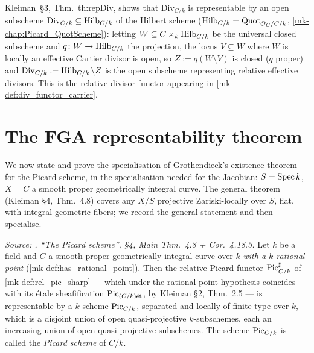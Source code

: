 \begin{remark}
  \label{mk-rem:div_functor_representability}
  Kleiman~\S 3, Thm.~th:repDiv, shows that \(\mathrm{Div}_{C/k}\) is
  representable by an open subscheme \(\mathrm{Div}_{C/k} \subseteq
  \operatorname{Hilb}_{C/k}\) of the Hilbert scheme (\(\operatorname{Hilb}_{C/k} =
  \operatorname{Quot}_{\mathcal{O}_C/C/k}\), \ref{mk-chap:Picard_QuotScheme}): letting
  \(W \subseteq C \times_k \operatorname{Hilb}_{C/k}\) be the universal closed
  subscheme and \(q \colon W \to \operatorname{Hilb}_{C/k}\) the projection, the locus
  \(V \subseteq W\) where \(W\) is locally an effective Cartier divisor
  is open, so \(Z := q(W \setminus V)\) is closed (\(q\) proper) and
  \(\mathrm{Div}_{C/k} := \operatorname{Hilb}_{C/k} \setminus Z\) is the open
  subscheme representing relative effective divisors. This is
  the relative-divisor functor appearing in
  \ref{mk-def:div_functor_carrier}.
\end{remark}

\section{The FGA representability theorem}
\label{mk-sec:fga_pic_representability}

We now state and prove the specialisation of Grothendieck's existence theorem
for the Picard scheme, in the specialisation needed for the Jacobian:
\(S = \operatorname{Spec} k\), \(X = C\) a smooth proper geometrically integral
curve. The general theorem (Kleiman \S 4, Thm.~4.8) covers any
\(X/S\) projective Zariski-locally over \(S\), flat, with integral geometric
fibers; we record the general statement and then specialise.

\begin{theorem}
  \label{mk-thm:fga_pic_representability}

  \textit{Source: \cite{kleiman-picard}, ``The Picard scheme'', \S 4, Main Thm.~4.8
  + Cor.~4.18.3.}
  Let \(k\) be a field and \(C\) a smooth proper geometrically integral curve
  over \(k\) \emph{with a \(k\)-rational point}
  (\ref{mk-def:has_rational_point}). Then the relative Picard functor
  \(\operatorname{Pic}^\sharp_{C/k}\) of \ref{mk-def:rel_pic_sharp} --- which under the
  rational-point hypothesis coincides with its \'etale sheafification
  \(\operatorname{Pic}_{(C/k)\mathrm{\acute{e}t}}\), by Kleiman \S 2, Thm.~2.5 --- is representable by a
  \(k\)-scheme \(\operatorname{Pic}_{C/k}\), separated and locally of finite type over
  \(k\), which is a disjoint union of open quasi-projective
  \(k\)-subschemes, each an increasing union of open quasi-projective
  subschemes. The scheme \(\operatorname{Pic}_{C/k}\) is called the \emph{Picard scheme}
  of \(C/k\).
\end{theorem}


